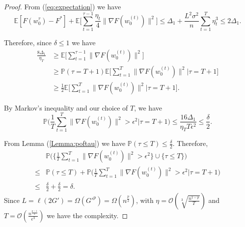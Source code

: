 \documentclass{article} %
\theoremstyle{plain}
\theoremstyle{definition}
\theoremstyle{remark}
\begin{document}
\begin{proof}
    From (\ref{eq:expectation}) we have
    \begin{equation}
        \mathbb{E}[F(w^{\tau}_0)-F^*]+\mathbb{E}\Big[\sum_{t=1}^{\tau-1}\frac{\eta_t}{4}\|\nabla F(w^{(t)}_0)\|^2\Big]\leq \Delta_1+\frac{L^2\sigma^2}{n}\sum_{t=1}^T \eta_t^3\leq 2\Delta_1.
    \end{equation}

    Therefore, since $\delta\leq 1$ we have 
    \begin{align*}
        \frac{8\Delta_1}{\eta_T} & \geq \mathbb{E}\Big[\sum_{t=1}^{\tau-1}\|\nabla F(w^{(t)}_0)\|^2\Big] \\
        & \geq \mathbb{P}(\tau=T+1)\mathbb{E}\Big[\sum_{t=1}^T \|\nabla F(w^{(t)}_0)\|^2|\tau=T+1] \\
        & \geq \frac{1}{2}\mathbb{E}\Big[\sum_{t=1}^T\|\nabla F(w^{(t)}_0)\|^2|\tau=T+1\Big].
    \end{align*}

    By Markov's inequality and our choice of $T$, we have
    $$\mathbb{P}\Big(\frac{1}{T}\sum_{t=1}^T\|\nabla F(w^{(t)}_0)\|^2>\epsilon^2|\tau=T+1\Big)\leq \frac{16\Delta_1}{\eta_T T\epsilon^2}\leq \frac{\delta}{2}.$$
    
    From Lemma (\ref{Lemma:poftau}) we have $\mathbb{P}(\tau\leq T)\leq \frac{\delta}{2}$. Therefore, 
    \begin{align*}
        & \mathbb{P}\Big(\{\frac{1}{T}\sum_{t=1}^T\|\nabla F(w^{(t)}_0)\|^2>\epsilon^2\}\cup\{\tau\leq T\}\Big)\\
        \leq &\mathbb{P}(\tau\leq T)+\mathbb{P}\Big(\frac{1}{T}\sum_{t=1}^T\|\nabla F(w^{(t)}_0)\|^2>\epsilon^2|\tau=T+1)\\ 
        \leq &\frac{\delta}{2}+\frac{\delta}{2}=\delta.
    \end{align*}
    Since $L=\ell(2G')=\Omega(G'^p)=\Omega(n^{\frac{p}{2}})$, with $\eta=\mathcal{O}(\sqrt[3]{\frac{n^{1-p}}{T}})$ and $T=\mathcal{O}(\frac{n^{\frac{p-1}{2}}}{\epsilon^3})$ we have the complexity.
\end{proof}



\end{document}
